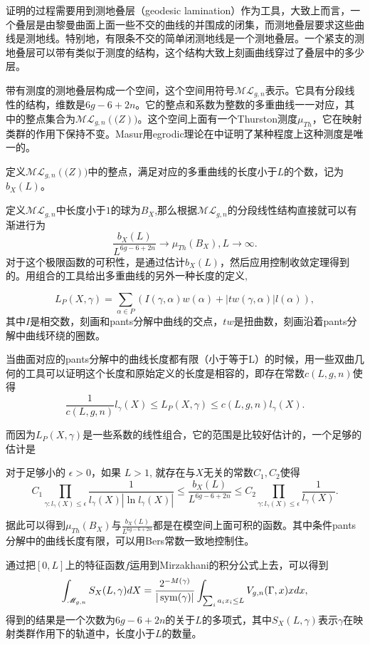 证明的过程需要用到测地叠层（geodesic lamination）作为工具，大致上而言，一个叠层是由黎曼曲面上面一些不交的曲线的并围成的闭集，而测地叠层要求这些曲线是测地线。特别地，有限条不交的简单闭测地线是一个测地叠层。一个紧支的测地叠层可以带有类似于测度的结构，这个结构大致上刻画曲线穿过了叠层中的多少层。


带有测度的测地叠层构成一个空间，这个空间用符号$\mathscr{ML}_{g,n}$表示。它具有分段线性的结构，维数是$6g-6+2n$。它的整点和系数为整数的多重曲线一一对应，其中的整点集合为$\mathscr{ML}_{g,n}(\mathbb(Z))$。这个空间上面有一个Thurston测度$\mu_{Th}$，它在映射类群的作用下保持不变。Masur用egrodic理论在\cite{ergodic}中证明了某种程度上这种测度是唯一的。

定义$\mathscr{ML}_{g,n}(\mathbb(Z))$中的整点，满足对应的多重曲线的长度小于$L$的个数，记为$b_X(L)$。

定义$\mathscr{ML}_{g,n}$中长度小于$1$的球为$B_X$,那么根据$\mathscr{ML}_{g,n}$的分段线性结构直接就可以有渐进行为$$
\frac{b_X(L)}{L^{6g-6+2n}}\to \mu_{Th}(B_X),L\to \infty.
$$
对于这个极限函数的可积性，是通过估计$b_X(L)$，然后应用控制收敛定理得到的。用组合的工具给出多重曲线的另外一种长度的定义,

$$
L_P(X,\gamma)=\sum_{\alpha\in P} (I(\gamma,\alpha)w(\alpha)+|tw(\gamma,\alpha)|l(\alpha)),
$$
其中$I$是相交数，刻画和pants分解中曲线的交点，$tw$是扭曲数，刻画沿着pants分解中曲线环绕的圈数。

当曲面对应的pants分解中的曲线长度都有限（小于等于L）的时候，用一些双曲几何的工具可以证明这个长度和原始定义的长度是相容的，即存在常数$c(L,g,n)$使得$$
\frac{1}{c(L,g,n)}l_\gamma(X)\leq L_{P}(X,\gamma)\leq c(L,g,n) l_\gamma(X).
$$

而因为$L_P(X,\gamma)$是一些系数的线性组合，它的范围是比较好估计的，一个足够的估计是

\begin{thmb}
对于足够小的 $\epsilon>0$，如果 $L>1$, 就存在与$X$无关的常数$C_1,C_2$使得$$
C_1 \prod_{\gamma:l_{\gamma}(X)\leq \epsilon}\frac{1}{l_{\gamma}(X)|\ln l_{\gamma}(X) |}\leq  \frac{b_X(L)}{L^{6g-6+2n}}\leq C_2\prod_{\gamma:l_{\gamma}(X)\leq \epsilon}\frac{1}{l_{\gamma}(X)}.
$$
\end{thmb}

据此可以得到$\mu_{Th}(B_X)$与$\frac{b_X(L)}{L^{6g-6+2n}}$都是在模空间上面可积的函数。其中条件pants分解中的曲线长度有限，可以用Bers常数一致地控制住。

通过把$[0,L]$上的特征函数$f$运用到Mirzakhani的积分公式上去，可以得到
$$
\int_{\mathscr{M}_{g,n}}S_X(L,\gamma)dX=\frac{2^{-M(\gamma)}}{|\operatorname{sym}(\gamma)|}\int_{\sum_{i}a_ix_i\leq L}V_{g,n}(\Gamma,x)xdx,
$$
得到的结果是一个次数为$6g-6+2n$的关于$L$的多项式，其中$S_X(L,\gamma)$表示$\gamma$在映射类群作用下的轨道中，长度小于$L$的数量。

